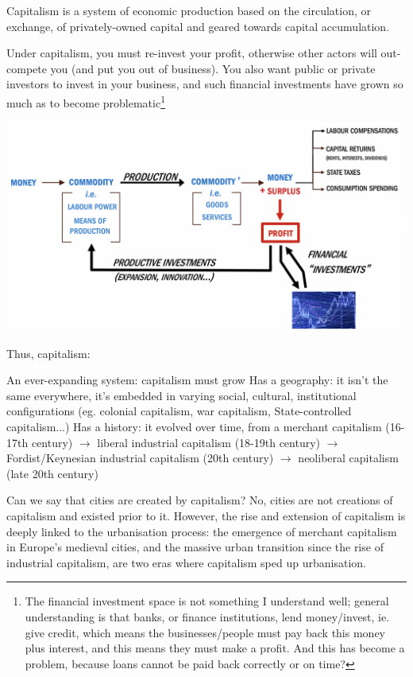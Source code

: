 \documentclass{article}
\begin{document}
Capitalism is a system of economic production based on the circulation, or exchange, of privately-owned capital and geared towards capital accumulation. 

Under capitalism, you must re-invest your profit, otherwise other actors will out-compete you (and put you out of business). You also want public or private investors to invest in your business, and such financial investments have grown so much as to become problematic\footnote{The financial investment space is not something I understand well; general understanding is that banks, or finance institutions, lend money/invest, ie. give credit, which means the businesses/people must pay back this money plus interest, and this means they must make a profit. And this has become a problem, because loans cannot be paid back correctly or on time?} 

\includegraphics[width=\textwidth]{capitalism}

Thus, capitalism:
\begin{outline}
	\1 An ever-expanding system: capitalism must grow
	\1 Has a geography: it isn't the same everywhere, it's embedded in varying social, cultural, institutional configurations (eg. colonial capitalism, war capitalism, State-controlled capitalism...)
	\1 Has a history: it evolved over time, from a merchant capitalism (16-17th century) $\rightarrow$ liberal industrial capitalism (18-19th century) $\rightarrow$ Fordist/Keynesian industrial capitalism (20th century) $\rightarrow$ neoliberal capitalism (late 20th century)
\end{outline}


Can we say that cities are created by capitalism? No, cities are not creations of capitalism and existed prior to it. However, the rise and extension of capitalism is deeply linked to the urbanisation process: the emergence of merchant capitalism in Europe's medieval cities, and the massive urban transition since the rise of industrial capitalism, are two eras where capitalism sped up urbanisation.
\end{document}
